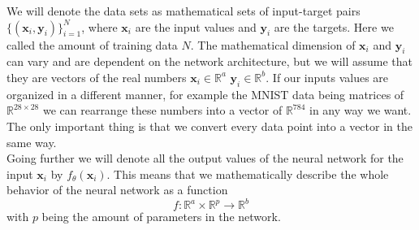 We will denote the data sets as mathematical sets of input-target pairs $\{(\mathbf{x}_i, \mathbf{y}_i)\}_{i=1}^N$, where $\mathbf{x}_i$ are the input values and $\mathbf{y}_i$ are the targets. Here we called the amount of training data $N$. The mathematical dimension of $\mathbf{x}_i$ and $\mathbf{y}_i$ can vary and are dependent on the network architecture, but we will assume that they are vectors of the real numbers $\mathbf{x}_i \in \mathbb{R}^a$ $\mathbf{y}_i \in \mathbb{R}^b$. If our inputs values are organized in a different manner, for example the MNIST data being matrices of $\mathbb{R}^{28\times28}$ we can rearrange these numbers into a vector of $\mathbb{R}^{784}$ in any way we want. The only important thing is that we convert every data point into a vector in the same way.\\
Going further we will denote all the output values of the neural network for the input $\mathbf{x}_i$ by $f_\theta(\mathbf{x}_i)$. This means that we mathematically describe the whole behavior of the neural network as a function
\begin{equation}
	f: \mathbb{R}^a \times \mathbb{R}^p \rightarrow \mathbb{R}^b
\end{equation}
with $p$ being the amount of parameters in the network.

